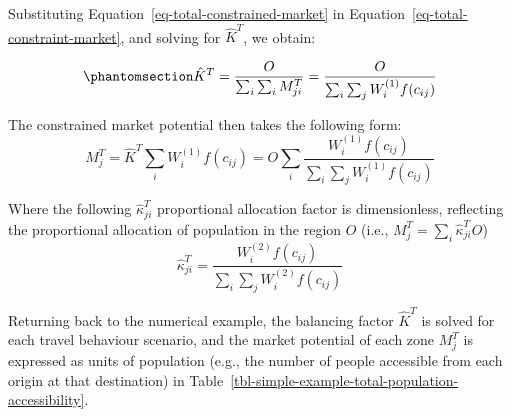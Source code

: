 \documentclass[
]{article}
\begin{document}
Substituting Equation~\ref{eq-total-constrained-market} in
Equation~\ref{eq-total-constraint-market}, and solving for \(\hat K^T\),
we obtain:

\begin{equation}\phantomsection\label{eq-total-population-balancing-factor}{
\hat K^T=\frac{O}{\sum_i\sum_i M^T_{ji}} = \frac{O}{\sum_i\sum_j W^{(1)}_i f(c_{ij})}
}\end{equation}

The constrained market potential then takes the following form: \[
M^T_j = \hat K^T \sum_i W^{(1)}_if(c_{ij}) = O \sum_i \frac{W_i^{(1)} f(c_{ij})}{\sum_i\sum_j W^{(1)}_i f(c_{ij})}
\]

Where the following \(\hat\kappa_{ji}^T\) proportional allocation factor
is dimensionless, reflecting the proportional allocation of population
in the region \(O\) (i.e., \(M^T_j = \sum_i \hat \kappa_{ji}^T O\)) \[
\hat \kappa_{ji}^T = \frac{W^{(2)}_i  f(c_{ij})}{\sum_i\sum_j W^{(2)}_if(c_{ij})}
\]

Returning back to the numerical example, the balancing factor
\(\hat K^T\) is solved for each travel behaviour scenario, and the
market potential of each zone \(M^T_j\) is expressed as units of
population (e.g., the number of people accessible from each origin at
that destination) in
Table~\ref{tbl-simple-example-total-population-accessibility}.
\end{document}
